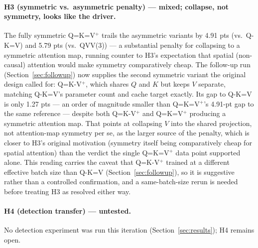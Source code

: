 \documentclass[11pt]{article}
\begin{document}
\paragraph{H3 (symmetric vs.\ asymmetric penalty) --- mixed; collapse, not
symmetry, looks like the driver.} The fully symmetric Q=K=V\(^+\) trails the
asymmetric variants by 4.91 pts (vs.\ Q-K=V) and 5.79 pts (vs.\ QVV(3)) ---
a substantial penalty for collapsing to a symmetric attention map, running
counter to H3's expectation that spatial (non-causal) attention would make
symmetry comparatively cheap. The follow-up run (Section~\ref{sec:followup})
now supplies the second symmetric variant the original design called for:
Q=K-V\(^+\), which shares \(Q\) and \(K\) but keeps \(V\) separate, matching
Q-K=V's parameter count and cache target exactly. Its gap to Q-K=V is only
1.27 pts --- an order of magnitude smaller than Q=K=V\(^+\)'s 4.91-pt gap to
the same reference --- despite both Q=K-V\(^+\) and Q=K=V\(^+\) producing a
symmetric attention map. That points at collapsing \(V\) into the shared
projection, not attention-map symmetry per se, as the larger source of the
penalty, which is closer to H3's original motivation (symmetry itself being
comparatively cheap for spatial attention) than the verdict the single
Q=K=V\(^+\) data point supported alone. This reading carries the caveat
that Q=K-V\(^+\) trained at a different effective batch size than Q-K=V
(Section~\ref{sec:followup}), so it is suggestive rather than a controlled
confirmation, and a same-batch-size rerun is needed before treating H3 as
resolved either way.

\paragraph{H4 (detection transfer) --- untested.} No detection experiment
was run this iteration (Section~\ref{sec:results}); H4 remains open.
\end{document}
